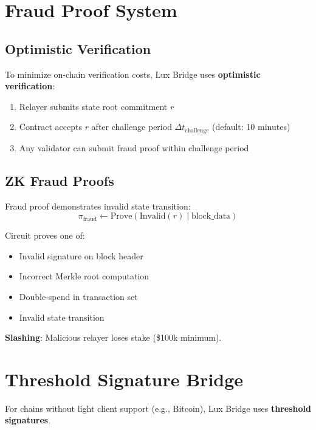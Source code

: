 \documentclass[11pt]{article}
\begin{document}
\section{Fraud Proof System}

\subsection{Optimistic Verification}

To minimize on-chain verification costs, Lux Bridge uses \textbf{optimistic verification}:

\begin{enumerate}
  \item Relayer submits state root commitment $r$
  \item Contract accepts $r$ after challenge period $\Delta t_{\text{challenge}}$ (default: 10 minutes)
  \item Any validator can submit fraud proof within challenge period
\end{enumerate}

\subsection{ZK Fraud Proofs}

Fraud proof demonstrates invalid state transition:
\begin{equation}
\pi_{\text{fraud}} \leftarrow \text{Prove}\left(\text{Invalid}(r) \mid \text{block\_data}\right)
\end{equation}

Circuit proves one of:
\begin{itemize}[leftmargin=1.1em]
  \item Invalid signature on block header
  \item Incorrect Merkle root computation
  \item Double-spend in transaction set
  \item Invalid state transition
\end{itemize}

\textbf{Slashing}: Malicious relayer loses stake (\$100k minimum).

\section{Threshold Signature Bridge}

For chains without light client support (e.g., Bitcoin), Lux Bridge uses \textbf{threshold signatures}.
\end{document}
